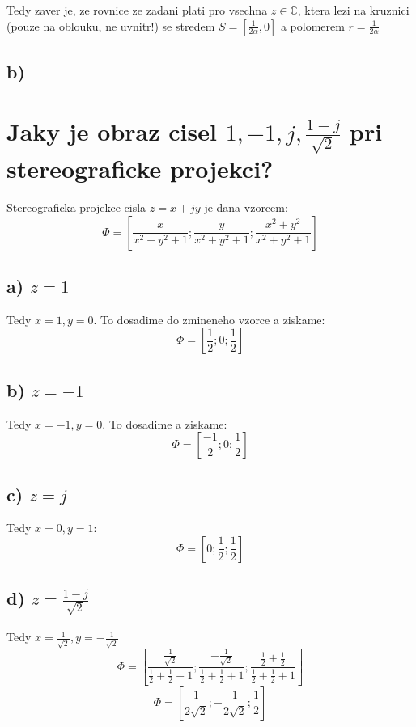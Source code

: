 Tedy zaver je, ze rovnice ze zadani plati pro vsechna $z \in \mathbb{C}$, ktera lezi na kruznici (pouze na oblouku, ne uvnitr!) se stredem $S=\left[\frac{1}{2\alpha},0\right]$ a polomerem $r=\frac{1}{2\alpha}$

\subsection*{b) }

\section{Jaky je obraz cisel $1, -1, j, \frac{1-j}{\sqrt{2}}$ pri stereograficke projekci?}
Stereograficka projekce cisla $z=x+jy$ je dana vzorcem:
$$\Phi = \left[ \frac{x}{x^2+y^2+1}; \frac{y}{x^2+y^2+1}; \frac{x^2+y^2}{x^2+y^2+1}\right] $$

\subsection*{a) $z=1$}
Tedy $x=1, y=0$. To dosadime do zmineneho vzorce a ziskame:
$$\Phi = \left[ \frac{1}{2};0; \frac{1}{2}\right]$$

\subsection*{b) $z=-1$}
Tedy $x=-1, y=0$. To dosadime a ziskame:
$$\Phi = \left[\frac{-1}{2};0;\frac{1}{2}\right]$$

\subsection*{c) $z=j$}
Tedy $x=0, y=1$:
$$\Phi = \left[0;\frac{1}{2};\frac{1}{2}\right]$$

\subsection*{d) $z= \frac{1-j}{\sqrt{2}}$}
Tedy $x=\frac{1}{\sqrt{2}}, y= -\frac{1}{\sqrt{2}}$
$$\Phi = \left[ \frac{\frac{1}{\sqrt{2}}}{\frac{1}{2}+\frac{1}{2}+1}; \frac{-\frac{1}{\sqrt{2}}}{\frac{1}{2}+\frac{1}{2}+1};\frac{\frac{1}{2}+\frac{1}{2}}{\frac{1}{2}+\frac{1}{2}+1}\right]$$
$$\Phi = \left[ \frac{1}{2\sqrt{2}};-\frac{1}{2\sqrt{2}};\frac{1}{2}\right]$$




